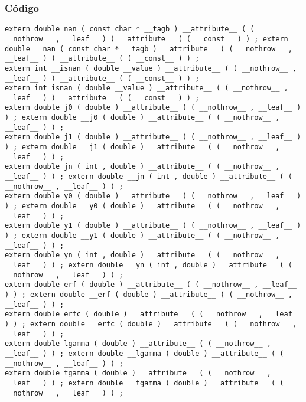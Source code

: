 \documentclass{beamer}
\begin{document}
\begin{frame}[fragile]
\frametitle{C\'odigo}
\begin{verbatim}
extern double nan ( const char * __tagb ) __attribute__ ( ( __nothrow__ , __leaf__ ) ) __attribute__ ( ( __const__ ) ) ; extern double __nan ( const char * __tagb ) __attribute__ ( ( __nothrow__ , __leaf__ ) ) __attribute__ ( ( __const__ ) ) ; 
extern int __isnan ( double __value ) __attribute__ ( ( __nothrow__ , __leaf__ ) ) __attribute__ ( ( __const__ ) ) ; 
extern int isnan ( double __value ) __attribute__ ( ( __nothrow__ , __leaf__ ) ) __attribute__ ( ( __const__ ) ) ; 
extern double j0 ( double ) __attribute__ ( ( __nothrow__ , __leaf__ ) ) ; extern double __j0 ( double ) __attribute__ ( ( __nothrow__ , __leaf__ ) ) ; 
extern double j1 ( double ) __attribute__ ( ( __nothrow__ , __leaf__ ) ) ; extern double __j1 ( double ) __attribute__ ( ( __nothrow__ , __leaf__ ) ) ; 
extern double jn ( int , double ) __attribute__ ( ( __nothrow__ , __leaf__ ) ) ; extern double __jn ( int , double ) __attribute__ ( ( __nothrow__ , __leaf__ ) ) ; 
extern double y0 ( double ) __attribute__ ( ( __nothrow__ , __leaf__ ) ) ; extern double __y0 ( double ) __attribute__ ( ( __nothrow__ , __leaf__ ) ) ; 
extern double y1 ( double ) __attribute__ ( ( __nothrow__ , __leaf__ ) ) ; extern double __y1 ( double ) __attribute__ ( ( __nothrow__ , __leaf__ ) ) ; 
extern double yn ( int , double ) __attribute__ ( ( __nothrow__ , __leaf__ ) ) ; extern double __yn ( int , double ) __attribute__ ( ( __nothrow__ , __leaf__ ) ) ; 
extern double erf ( double ) __attribute__ ( ( __nothrow__ , __leaf__ ) ) ; extern double __erf ( double ) __attribute__ ( ( __nothrow__ , __leaf__ ) ) ; 
extern double erfc ( double ) __attribute__ ( ( __nothrow__ , __leaf__ ) ) ; extern double __erfc ( double ) __attribute__ ( ( __nothrow__ , __leaf__ ) ) ; 
extern double lgamma ( double ) __attribute__ ( ( __nothrow__ , __leaf__ ) ) ; extern double __lgamma ( double ) __attribute__ ( ( __nothrow__ , __leaf__ ) ) ; 
extern double tgamma ( double ) __attribute__ ( ( __nothrow__ , __leaf__ ) ) ; extern double __tgamma ( double ) __attribute__ ( ( __nothrow__ , __leaf__ ) ) ; 
\end{verbatim}
\end{frame}
\end{document}
